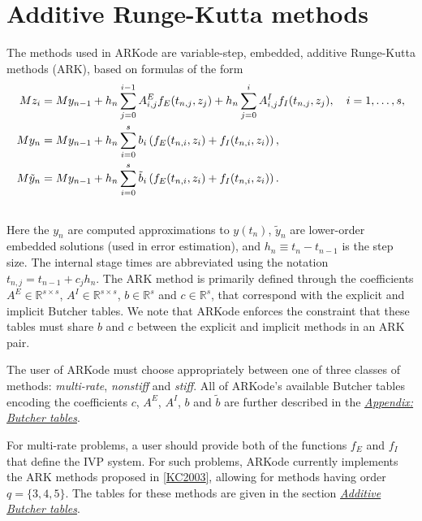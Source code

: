 \documentclass[letterpaper,10pt,english]{sphinxmanual}
\begin{document}
\section{Additive Runge-Kutta methods}
\label{Mathematics:mathematics-ark}\label{Mathematics:additive-runge-kutta-methods}
The methods used in ARKode are variable-step, embedded,
additive Runge-Kutta methods (ARK), based on formulas of the
form
\label{Mathematics:equation-ARK}\begin{gather}
\begin{split}M z_i &= M y_{n-1} + h_n \sum_{j=0}^{i-1} A^E_{i,j} f_E(t_{n,j}, z_j)
              + h_n \sum_{j=0}^{i}   A^I_{i,j} f_I(t_{n,j}, z_j),
\quad i=1,\ldots,s, \\
M y_n &= M y_{n-1} + h_n \sum_{i=0}^{s} b_i \left(f_E(t_{n,i}, z_i)
              + f_I(t_{n,i}, z_i)\right), \\
M \tilde{y}_n &= M y_{n-1} + h_n \sum_{i=0}^{s} \tilde{b}_i
    \left(f_E(t_{n,i}, z_i) + f_I(t_{n,i}, z_i)\right).\end{split}\label{Mathematics-ARK}\\\begin{split}\end{split}\notag
\end{gather}
Here the $y_n$ are computed approximations to $y(t_n)$,
$\tilde{y}_n$ are lower-order embedded solutions (used in error
estimation), and $h_n \equiv t_n - t_{n-1}$ is the step size.
The internal stage times are abbreviated using the notation
$t_{n,j} = t_{n-1} + c_j h_n$.  The ARK method is primarily
defined through the coefficients $A^E \in \mathbb{R}^{s\times s}$,
$A^I \in \mathbb{R}^{s\times s}$, $b \in \mathbb{R}^{s}$ and
$c \in \mathbb{R}^{s}$, that correspond with the explicit and
implicit Butcher tables.  We note that ARKode enforces the constraint
that these tables must share $b$ and $c$ between the
explicit and implicit methods in an ARK pair.

The user of ARKode must choose appropriately between one of three
classes of methods: \emph{multi-rate}, \emph{nonstiff} and \emph{stiff}.  All of
ARKode's available Butcher tables encoding the coefficients $c$,
$A^E$, $A^I$, $b$ and $\tilde{b}$ are further
described in the {\hyperref[Butcher:butcher]{\emph{Appendix: Butcher tables}}}.

For multi-rate problems, a user should provide both of the functions
$f_E$ and $f_I$ that define the IVP system.  For such
problems, ARKode currently implements the ARK methods proposed in
{\hyperref[References:kc2003]{{[}KC2003{]}}}, allowing for methods having order $q = \{3,4,5\}$.
The tables for these methods are given in the section
{\hyperref[Butcher:butcher-additive]{\emph{Additive Butcher tables}}}.
\end{document}
